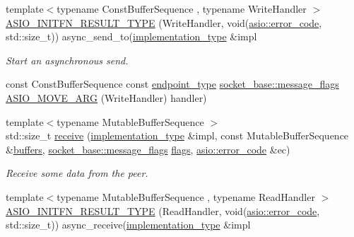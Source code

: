 \begin{DoxyCompactItemize}
{\footnotesize template$<$typename Const\+Buffer\+Sequence , typename Write\+Handler $>$ }\\\hyperlink{classasio_1_1datagram__socket__service_aa138564cf95e4f4e9e5caf2170bb9d92}{A\+S\+I\+O\+\_\+\+I\+N\+I\+T\+F\+N\+\_\+\+R\+E\+S\+U\+L\+T\+\_\+\+T\+Y\+P\+E} (Write\+Handler, void(\hyperlink{classasio_1_1error__code}{asio\+::error\+\_\+code}, std\+::size\+\_\+t)) async\+\_\+send\+\_\+to(\hyperlink{classasio_1_1datagram__socket__service_a41dcdc6b8a3500d6f88e10b6c08925cd}{implementation\+\_\+type} \&impl
\begin{DoxyCompactList}\small\item\em Start an asynchronous send. \end{DoxyCompactList}\item 
const Const\+Buffer\+Sequence const \hyperlink{classasio_1_1datagram__socket__service_a135b71c44f1e92b67cea4402f46578a9}{endpoint\+\_\+type} \hyperlink{classasio_1_1socket__base_ac3cf77465dfedfe1979b5415cf32cc94}{socket\+\_\+base\+::message\+\_\+flags} \hyperlink{classasio_1_1datagram__socket__service_a17d5ec70ea7b242d72711bb916be7e02}{A\+S\+I\+O\+\_\+\+M\+O\+V\+E\+\_\+\+A\+R\+G} (Write\+Handler) handler)
\item 
{\footnotesize template$<$typename Mutable\+Buffer\+Sequence $>$ }\\std\+::size\+\_\+t \hyperlink{classasio_1_1datagram__socket__service_a283adcc43c76a14e3e38820d84418eb6}{receive} (\hyperlink{classasio_1_1datagram__socket__service_a41dcdc6b8a3500d6f88e10b6c08925cd}{implementation\+\_\+type} \&impl, const Mutable\+Buffer\+Sequence \&\hyperlink{classasio_1_1datagram__socket__service_a8d5deea235095a9d82c4d36af00eaa0f}{buffers}, \hyperlink{classasio_1_1socket__base_ac3cf77465dfedfe1979b5415cf32cc94}{socket\+\_\+base\+::message\+\_\+flags} \hyperlink{classasio_1_1datagram__socket__service_a4bb3745dcca72273467ef14d34819736}{flags}, \hyperlink{classasio_1_1error__code}{asio\+::error\+\_\+code} \&ec)
\begin{DoxyCompactList}\small\item\em Receive some data from the peer. \end{DoxyCompactList}\item 
{\footnotesize template$<$typename Mutable\+Buffer\+Sequence , typename Read\+Handler $>$ }\\\hyperlink{classasio_1_1datagram__socket__service_ad202cd9982ae0c291579107ab851d71d}{A\+S\+I\+O\+\_\+\+I\+N\+I\+T\+F\+N\+\_\+\+R\+E\+S\+U\+L\+T\+\_\+\+T\+Y\+P\+E} (Read\+Handler, void(\hyperlink{classasio_1_1error__code}{asio\+::error\+\_\+code}, std\+::size\+\_\+t)) async\+\_\+receive(\hyperlink{classasio_1_1datagram__socket__service_a41dcdc6b8a3500d6f88e10b6c08925cd}{implementation\+\_\+type} \&impl

\end{DoxyCompactItemize}
